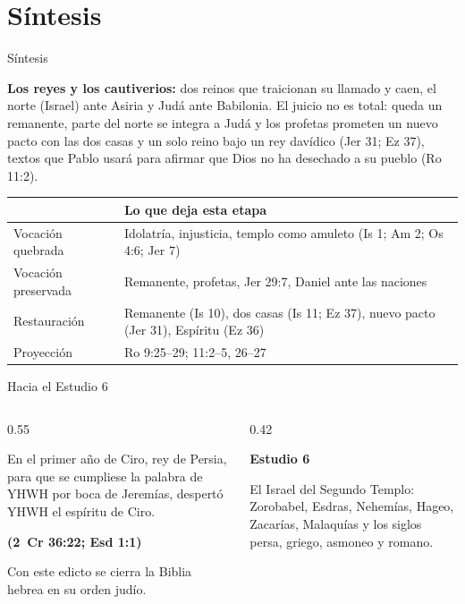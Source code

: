 \documentclass[hyperref={bookmarks=false},aspectratio=169]{beamer}
\newcommand{\fuente}[1]{\par\hfill{\upshape\bfseries\footnotesize\textcolor{ladrillo}{#1}}}
\newcommand{\notafig}[1]{\par\vspace{2pt}{\fontsize{5}{6}\selectfont\color{sepia}\hfill\textit{Nota.} #1\par}}
\begin{document}
\section{Síntesis}
\begin{frame}{Síntesis}
\begin{tcolorbox}[colback=piedra,colframe=ladrillo,boxrule=1pt,arc=3pt,fontupper=\footnotesize]
\textbf{\textcolor{cafe}{Los reyes y los cautiverios:}} dos reinos que traicionan su llamado y caen, el norte (Israel) ante Asiria y Judá ante Babilonia. El juicio no es total: queda un remanente, parte del norte se integra a Judá y los profetas prometen un nuevo pacto con las dos casas y un solo reino bajo un rey davídico (Jer 31; Ez 37), textos que Pablo usará para afirmar que Dios no ha desechado a su pueblo (Ro 11:2).
\end{tcolorbox}
\vspace{2pt}
\scriptsize\renewcommand{\arraystretch}{1.25}
\begin{tabular}{>{\RaggedRight\arraybackslash}p{3.0cm}>{\RaggedRight\arraybackslash}p{8.3cm}}
\toprule
{\color{ladrillo}\bfseries Eje} & {\color{ladrillo}\bfseries Lo que deja esta etapa}\\\midrule
Vocación quebrada & Idolatría, injusticia, templo como amuleto (Is 1; Am 2; Os 4:6; Jer 7)\\
Vocación preservada & Remanente, profetas, Jer 29:7, Daniel ante las naciones\\
Restauración & Remanente (Is 10), dos casas (Is 11; Ez 37), nuevo pacto (Jer 31), Espíritu (Ez 36)\\
Proyección & Ro 9:25--29; 11:2--5, 26--27\\
\bottomrule
\end{tabular}
\notafig{Elaboración propia.}
\end{frame}

\begin{frame}{Hacia el Estudio 6}
\begin{columns}[c,onlytextwidth]
\begin{column}{0.55\textwidth}
\begin{cita}En el primer año de Ciro, rey de Persia, para que se cumpliese la palabra de YHWH por boca de Jeremías, despertó YHWH el espíritu de Ciro.\fuente{(2~Cr 36:22; Esd 1:1)}\end{cita}
\small Con este edicto se cierra la Biblia hebrea en su orden judío.
\end{column}
\begin{column}{0.42\textwidth}
\begin{tcolorbox}[colback=cafe,colframe=cafeosc,coltext=piedra,boxrule=0.8pt,arc=3pt,fontupper=\small]
\textbf{Estudio 6}\par\smallskip
El Israel del Segundo Templo: Zorobabel, Esdras, Nehemías, Hageo, Zacarías, Malaquías y los siglos persa, griego, asmoneo y romano.
\end{tcolorbox}
\end{column}
\end{columns}
\end{frame}
\end{document}
